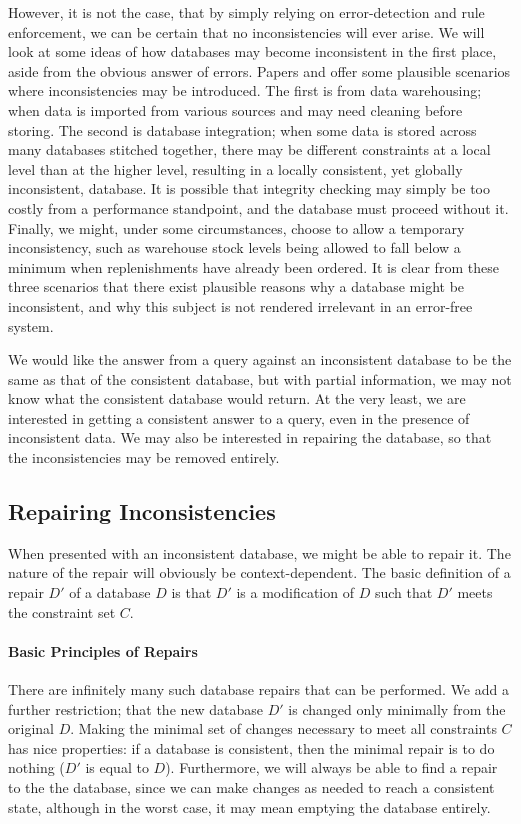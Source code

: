 However, it is not the case, that by simply relying on error-detection and rule enforcement, we can be certain that no inconsistencies will ever arise. We will look at some ideas of how databases may become inconsistent in the first place, aside from the obvious answer of errors. Papers \cite{CQI} and \cite{CQ} offer some plausible scenarios where inconsistencies may be introduced. The first is from data warehousing; when data is imported from various sources and may need cleaning before storing. The second is database integration; when some data is stored across many databases stitched together, there may be different constraints at a local level than at the higher level, resulting in a locally consistent, yet globally inconsistent, database. It is possible that integrity checking may simply be too costly from a performance standpoint, and the database must proceed without it. Finally, we might, under some circumstances, choose to allow a temporary inconsistency, such as warehouse stock levels being allowed to fall below a minimum when replenishments have already been ordered. It is clear from these three scenarios that there exist plausible reasons why a database might be inconsistent, and why this subject is not rendered irrelevant in an error-free system.

We would like the answer from a query against an inconsistent database to be the same as that of the consistent database, but with partial information, we may not know what the consistent database would return. At the very least, we are interested in getting a consistent answer to a query, even in the presence of inconsistent data. We may also be interested in repairing the database, so that the inconsistencies may be removed entirely.

\subsection*{Repairing Inconsistencies}
When presented with an inconsistent database, we might be able to repair it. The nature of the repair will obviously be context-dependent. The basic definition of a repair $D'$ of a database $D$ is that $D'$ is a modification of $D$ such that $D'$ meets the constraint set $C$.

\paragraph{Basic Principles of Repairs}
There are infinitely many such database repairs that can be performed. We add a further restriction; that the new database $D'$ is changed only minimally from the original $D$. Making the minimal set of changes necessary to meet all constraints $C$ has nice properties: if a database is consistent, then the minimal repair is to do nothing ($D'$ is equal to $D$). Furthermore, we will always be able to find a repair to the the database, since we can make changes as needed to reach a consistent state, although in the worst case, it may mean emptying the database entirely. \cite{CQI}

